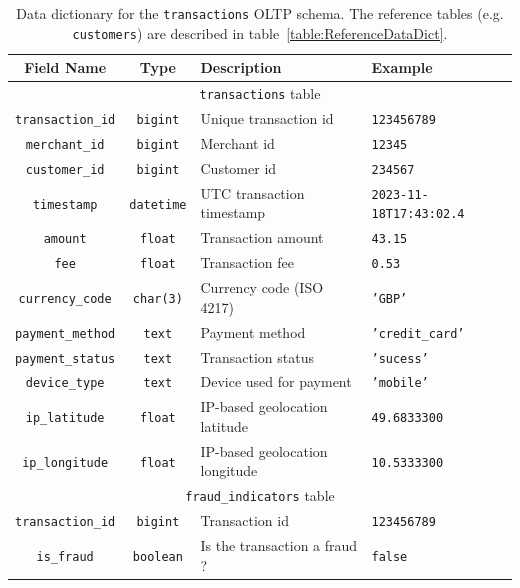 \documentclass[11pt,a4paper,computermodern]{article}
\newcommand{\code}{\texttt}
\begin{document}
\begin{table}[!htb]
	\centering
	\begin{threeparttable}
		\caption{Data dictionary for the \code{transactions} OLTP schema. The reference tables (e.g. \code{customers}) are described in table~\ref{table:ReferenceDataDict}.}
		\label{table:OLTPDataDict}
		\begin{tabularx}{0.99\textwidth}{c c >{\centering\arraybackslash}X >{\centering\arraybackslash}X}
			\toprule
			Field Name & Type & Description & Example  \\
			\midrule
			\multicolumn{4}{c}{\code{transactions} table}\\
			\code{transaction\_id} & \code{bigint} & Unique transaction id & \code{123456789} \\
			\code{merchant\_id} & \code{bigint} & Merchant id & \code{12345} \\
			\code{customer\_id} & \code{bigint} & Customer id & \code{234567} \\
			\code{timestamp} & \code{datetime} & UTC transaction timestamp & \code{2023-11-18T17:43:02.4} \\
			\code{amount} & \code{float} & Transaction amount & \code{43.15} \\
			\code{fee} & \code{float} & Transaction fee & \code{0.53} \\
			\code{currency\_code} & \code{char(3)} & Currency code (ISO 4217) & \code{'GBP'} \\
			\code{payment\_method} & \code{text} & Payment method & \code{'credit\_card'} \\
			\code{payment\_status} & \code{text} & Transaction status & \code{'sucess'} \\
			\code{device\_type} & \code{text} & Device used for payment & \code{'mobile'} \\
			\code{ip\_latitude} & \code{float} & IP-based geolocation latitude & \code{49.6833300} \\
			\code{ip\_longitude} & \code{float} & IP-based geolocation longitude & \code{10.5333300} \\
			
			\midrule
			\multicolumn{4}{c}{\code{fraud\_indicators} table}\\
			\code{transaction\_id} & \code{bigint} & Transaction id & \code{123456789} \\
			\code{is\_fraud} & \code{boolean} & Is the transaction a fraud ? & \code{false} \\
			\bottomrule
		\end{tabularx}
	\end{threeparttable}
\end{table}
\end{document}
